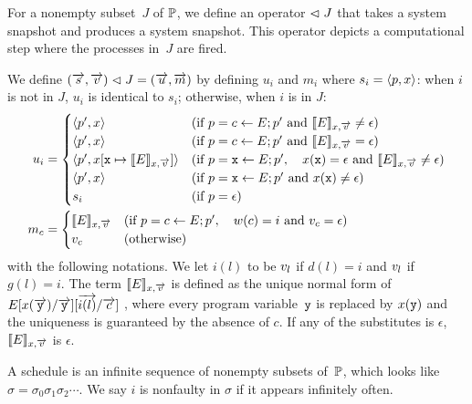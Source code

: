 {For a nonempty subset~$J$ of $\mathbb{P}$, we define an operator $\vartriangleleft J$ that
takes a system snapshot and produces a system snapshot.
This operator depicts a computational step where the processes in~$J$
are fired.

We define $
(\overrightarrow s, \overrightarrow v) \vartriangleleft J = (\overrightarrow u, \overrightarrow m)
$ by defining
$u_i$ and $m_i$
where $s_i = \langle{p,x}\rangle$:
when $i$ is not in $J$, $u_i$ is identical to $s_i$; otherwise, when $i$
is in $J$:
\begin{align*}
 u_i & =
 \begin{cases}
 \langle{p',x}\rangle  & (\text{if } p = c
 \leftarrow E; p' \text{ and }\llbracket{E}\rrbracket_{x,\overrightarrow v} \neq \epsilon)
 \\
 \langle{p',x}\rangle  & (\text{if } p = c
 \leftarrow E; p' \text{ and }\llbracket{E}\rrbracket_{x,\overrightarrow v} = \epsilon)
 \\
 \langle{p', x[\texttt{x} \mapsto \llbracket{E}\rrbracket_{x, \overrightarrow v}]}\rangle&
                       (\text{if } p = \texttt{x} \leftarrow E; p', \quad
 x(\texttt{x}) = \epsilon  \text{ and } \llbracket{E}\rrbracket_{x, \overrightarrow v} \neq \epsilon) \\
 \langle{p', x}\rangle & (\text{if } p = \texttt{x} \leftarrow E; p' \text{
 and }
 x(\texttt{x}) \neq \epsilon) \\
 s_i & (\text{if } p = \epsilon)
 \end{cases}\\
 {m}_{c} & =
 \begin{cases}
 \llbracket{E}\rrbracket_{x, \overrightarrow v} & (\text{if } p = c \leftarrow E; p',\quad w(c)= i
  \text{
 and } {v}_{c} = \epsilon) \\
 {v}_{c} &(\text{otherwise})
 \end{cases}\\
\end{align*}
with the following notations.
We let $i(l)$ to be ${v}_{l}$ if $d(l)=i$ and
${v}_{l}$ if $g(l) = i$.
The term
$\llbracket{E}\rrbracket_{x, \overrightarrow v}$ is defined as the unique normal form
of $E[x(\overrightarrow{\texttt{y}}) / \overrightarrow{\texttt{y}}][\overrightarrow{i(l)}/\overrightarrow c]$ , where
every program variable~$\texttt{y}$ is replaced by $x(\texttt{y})$ and the
uniqueness is guaranteed by the absence of $c$.
If any of the substitutes is $\epsilon$,
$\llbracket{E}\rrbracket_{x, \overrightarrow v}$ is $\epsilon$.

A schedule is an infinite sequence of nonempty subsets of~$\mathbb{P}$,
which looks like $\sigma = \sigma_0\sigma_1\sigma_2\cdots$.
We say $i$ is nonfaulty in $\sigma$
if it appears infinitely often.

}
